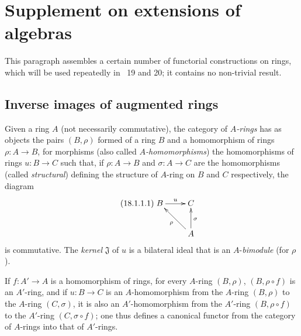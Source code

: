 \section{Supplement on extensions of algebras}
\label{section:0.18}

This paragraph assembles a certain number of functorial constructions on rings, which will be used repeatedly in \textsection\textsection~19 and 20; it contains no non-trivial result.

\subsection{Inverse images of augmented rings}
\label{subsection:0.18.1}

\begin{env}[18.1.1]
\label{0.18.1.1}
Given a ring $A$ (not necessarily commutative), the category of \emph{$A$-rings} has as objects the pairs $(B,\rho)$ formed of a ring $B$ and a homomorphism of rings $\rho:A\to B$, for morphisms (also called \emph{$A$-homomorphisms}) the homomorphisms of rings $u:B\to C$ such that, if $\rho:A\to B$ and $\sigma:A\to C$ are the homomorphisms (called \emph{structural}) defining the structure of $A$-ring on $B$ and $C$ respectively, the diagram
\begin{equation}
\tag{18.1.1.1}
  \label{0.18.1.1.1}
  \xymatrix{
    B\ar[r]^u & C\\
    & A\ar[lu]^\rho\ar[u]_\sigma
  }
\end{equation}
is commutative.
The \emph{kernel} $\mathfrak{J}$ of $u$ is a bilateral ideal that is an $A$-\emph{bimodule} (for $\rho$).

If $f:A'\to A$ is a homomorphism of rings, for every $A$-ring $(B,\rho)$, $(B,\rho\circ f)$ is an $A'$-ring, and if $u:B\to C$ is an $A$-homomorphism from the $A$-ring $(B,\rho)$
to the $A$-ring $(C,\sigma)$, it is also an $A'$-homomorphism from the $A'$-ring $(B,\rho\circ f)$ to the $A'$-ring $(C,\sigma\circ f)$; one thus defines a canonical functor from the category of $A$-rings into that of $A'$-rings.
\end{env}

